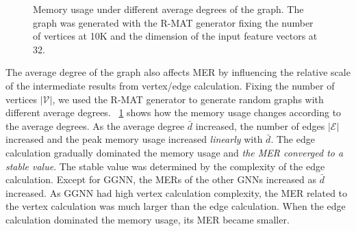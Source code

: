 \begin{figure}
    \centering
    \caption{Memory usage under different average degrees of the graph. The graph was generated with the R-MAT generator fixing the number of vertices at 10K and the dimension of the input feature vectors at 32.}
    \label{fig:exp_memory_expansion_ratio_input_graph_number_of_edges}
\end{figure}

The average degree of the graph also affects MER by influencing the relative scale of the intermediate results from vertex/edge calculation.
Fixing the number of vertices $|\mathcal{V}|$, we used the R-MAT generator to generate random graphs with different average degrees.
\figurename~\ref{fig:exp_memory_expansion_ratio_input_graph_number_of_edges} shows how the memory usage changes according to the average degrees.
As the average degree $\bar{d}$ increased, the number of edges $|\mathcal{E}|$ increased and the peak memory usage increased \emph{linearly} with $\bar{d}$.
The edge calculation gradually dominated the memory usage and \emph{the MER converged to a stable value}.
The stable value was determined by the complexity of the edge calculation.
Except for GGNN, the MERs of the other GNNs increased as $\bar{d}$ increased.
As GGNN had high vertex calculation complexity, the MER related to the vertex calculation was much larger than the edge calculation.
When the edge calculation dominated the memory usage, its MER became smaller.

